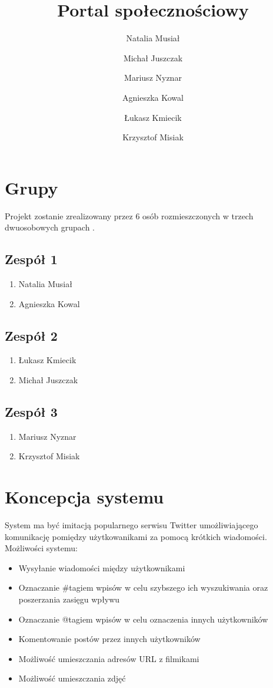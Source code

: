 \documentclass[a4paper]{article}
\title{Portal społecznościowy}
\author{ Natalia Musiał \and Michał Juszczak \and Mariusz Nyznar\and  Agnieszka Kowal \and Łukasz Kmiecik \and Krzysztof Misiak}
\begin{document}
\maketitle


\section{Grupy}

Projekt zostanie zrealizowany przez 6 osób rozmieszczonych w trzech dwuosobowych grupach . 
\subsection{Zespół 1}
\begin{enumerate}
\item Natalia Musiał
\item Agnieszka Kowal
\end{enumerate}
\subsection{Zespół 2}
\begin{enumerate}
\item Łukasz Kmiecik
\item Michał Juszczak
\end{enumerate}
\subsection{Zespół 3}
\begin{enumerate}
\item Mariusz Nyznar
\item Krzysztof Misiak

\end{enumerate}


\section{Koncepcja systemu}

System ma być imitacją popularnego serwisu Twitter umożliwiającego komunikację pomiędzy użytkowanikami za pomocą krótkich wiadomości.
Możliwości systemu:
\begin{itemize}
\item Wysyłanie wiadomości między użytkownikami
\item Oznaczanie \#tagiem wpisów w celu szybszego ich wyszukiwania oraz poszerzania zasięgu wpływu
\item Oznaczanie @tagiem wpisów w celu oznaczenia innych użytkowników
\item Komentowanie postów przez innych użytkowników
\item Możliwość umieszczania adresów URL z filmikami
\item Możliwość umieszczania zdjęć 

\end{itemize}
\end{document}
